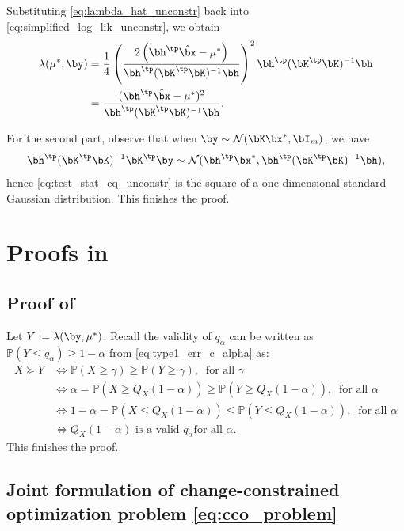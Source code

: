 \documentclass[11pt]{article}
\numberwithin{equation}{section}
\numberwithin{figure}{section}
\begin{document}
Substituting \eqref{eq:lambda_hat_unconstr} back into \eqref{eq:simplified_log_lik_unconstr}, we obtain
\begin{align*}
    \lambda(\mu^*, \by) 
    &= \frac{1}{4} \left(\frac{2 \left( \bh^\tp \hat{\bx} - \mu^* \right)}{\bh^\tp (\bK^\tp \bK)^{-1} \bh} \right)^2 \bh^\tp (\bK^\tp \bK)^{-1} \bh \\
    &= \frac{(\bh^\tp \hat{\bx} - \mu^*)^2}{\bh^\tp (\bK^\tp \bK)^{-1} \bh}.
\end{align*}
 
For the second part, observe that when $\by \sim \mathcal{N}(\bK\bx^*, \bI_m)$, we have
\[
    \bh^\tp (\bK^\tp \bK)^{-1} \bK^\tp \by \sim \mathcal{N}(\bh^\tp\bx^*, \bh^\tp 
    (\bK^\tp \bK)^{-1} \bh),
\] hence \eqref{eq:test_stat_eq_unconstr} is the square of a one-dimensional standard Gaussian distribution.
This finishes the proof.

\section{Proofs in }
\label{app:sec:interval_methodology_proofs}

\subsection{Proof of }
\label{sec:proof-subsec:stochastic_dominance}

Let $Y := \lambda (\by, \mu^*)$.
Recall the validity of $q_\alpha$ can be written as $\mathbb{P}(Y\leq q_\alpha) \geq 1-\alpha$ from \eqref{eq:type1_err_c_alpha} as:
\begin{align*}
X \succeq Y &\iff \mathbb{P}(X\geq \gamma) \geq \mathbb{P}(Y \geq \gamma), \; \; \text{for all } \gamma 
\\ 
&\iff \alpha = \mathbb{P}(X\geq Q_X(1-\alpha)) \geq \mathbb{P}(Y\geq Q_X(1-\alpha)), \; \; \text{for all } \alpha 
\\
&\iff 1-\alpha = \mathbb{P}(X\leq Q_X(1-\alpha))\leq \mathbb{P}(Y \leq Q_X(1-\alpha)), \; \; \text{for all } \alpha 
\\
&\iff Q_X(1-\alpha) \text{ is a valid } q_\alpha \text{for all } \alpha.
\end{align*}
This finishes the proof.

\subsection[Joint formulation of change-constrained optimization problem]{Joint formulation of change-constrained optimization problem \eqref{eq:cco_problem}}
\label{sec:joint-optimatization}
\end{document}
